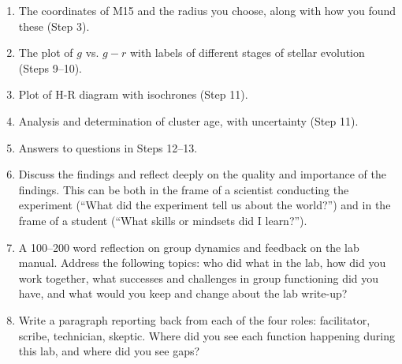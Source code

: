 \begin{enumerate}
	
	\item The coordinates of M15 and the radius you choose, along with how you found these (Step 3).
	
	\item The plot of $g$ vs. $g-r$ with labels of different stages of stellar evolution (Steps 9--10).
	
	\item Plot of H-R diagram with isochrones (Step 11).
	
	\item Analysis and determination of cluster age, with uncertainty (Step 11).
	
	\item Answers to questions in Steps 12--13.
	
	\item Discuss the findings and reflect deeply on the quality and importance of the findings. This can
	be both in the frame of a scientist conducting the experiment (“What did the experiment tell us
	about the world?”) and in the frame of a student (“What skills or mindsets did I learn?”).
	
	\item A 100–200 word reflection on group dynamics and feedback on the lab manual. Address the
	following topics: who did what in the lab, how did you work together, what successes and
	challenges in group functioning did you have, and what would you keep and change about the
	lab write-up?
	
	\item Write a paragraph reporting back from each of the four roles: facilitator, scribe, technician,
	skeptic. Where did you see each function happening during this lab, and where did you see
	gaps?
\end{enumerate}